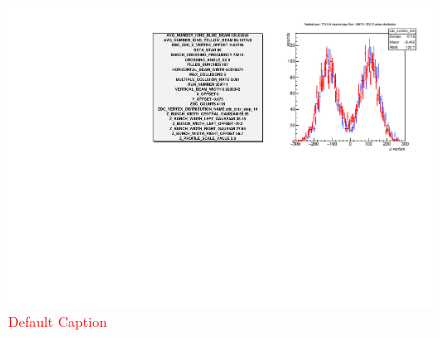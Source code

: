 \begin{figure}
\begin{center}
\includegraphics[width=\linewidth,height=\textheight,keepaspectratio]{../HourglassCorrection/figs/359711_step14_config_compare}
\caption{ 
\textcolor{red}{Default Caption}
}
\label{fig:359711_step14_config_compare}
\end{center}
\end{figure}
